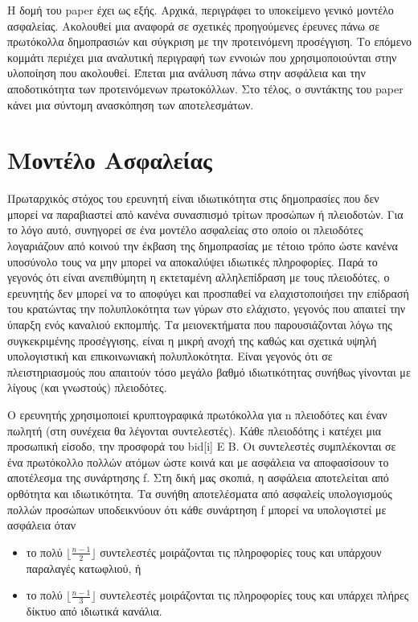 \documentclass[letterpaper,11pt]{article}
\begin{document}
Η δομή του paper έχει ως εξής. Αρχικά, περιγράφει το υποκείμενο γενικό μοντέλο ασφαλείας. Ακολουθεί μια αναφορά
σε σχετικές προηγούμενες έρευνες πάνω σε πρωτόκολλα δημοπρασιών και σύγκριση με την προτεινόμενη προσέγγιση. Το
επόμενο κομμάτι περιέχει μια αναλυτική περιγραφή των εννοιών που χρησιμοποιούνται στην υλοποίηση που ακολουθεί.
Έπεται μια ανάλυση πάνω στην ασφάλεια και την αποδοτικότητα των προτεινόμενων πρωτοκόλλων. Στο τέλος, ο
συντάκτης του paper κάνει μια σύντομη ανασκόπηση των αποτελεσμάτων.

\section{Μοντέλο Ασφαλείας}

Πρωταρχικός στόχος του ερευνητή είναι ιδιωτικότητα στις δημοπρασίες που δεν μπορεί να παραβιαστεί από κανένα
συνασπισμό τρίτων προσώπων ή πλειοδοτών. Για το λόγο αυτό, συνηγορεί σε ένα μοντέλο ασφαλείας στο οποίο οι
πλειοδότες λογαριάζουν από κοινού την έκβαση της δημοπρασίας με τέτοιο τρόπο ώστε κανένα υποσύνολο τους να μην
μπορεί να αποκαλύψει ιδιωτικές πληροφορίες. Παρά το γεγονός ότι είναι ανεπιθύμητη η εκτεταμένη αλληλεπίδραση με
τους πλειοδότες, ο ερευνητής δεν μπορεί να το αποφύγει και προσπαθεί να ελαχιστοποιήσει την επίδρασή του
κρατώντας την πολυπλοκότητα των γύρων στο ελάχιστο, γεγονός που απαιτεί την ύπαρξη ενός καναλιού εκπομπής. Τα
μειονεκτήματα που παρουσιάζονται λόγω της συγκεκριμένης προσέγγισης, είναι η μικρή ανοχή της καθώς και σχετικά
υψηλή υπολογιστική και επικοινωνιακή πολυπλοκότητα. Είναι γεγονός ότι σε πλειστηριασμούς που απαιτούν τόσο
μεγάλο βαθμό ιδιωτικότητας συνήθως γίνονται με λίγους (και γνωστούς) πλειοδότες.

Ο ερευνητής χρησιμοποιεί κρυπτογραφικά πρωτόκολλα για n πλειοδότες και έναν πωλητή (στη συνέχεια θα λέγονται
συντελεστές). Κάθε πλειοδότης i κατέχει μια προσωπική είσοδο, την προσφορά του bid[i] E B. Οι συντελεστές
συμπλέκονται σε ένα πρωτόκολλο πολλών ατόμων ώστε κοινά και με ασφάλεια να αποφασίσουν το αποτέλεσμα της
συνάρτησης f. Στη δική μας σκοπιά, η ασφάλεια αποτελείται από ορθότητα και ιδιωτικότητα. Τα συνήθη
αποτελέσματα από ασφαλείς υπολογισμούς πολλών προσώπων υποδεικνύουν ότι κάθε συνάρτηση f μπορεί να υπολογιστεί
με ασφάλεια όταν
\begin{itemize}
	\item το πολύ $\lfloor \frac{n-1}{2} \rfloor$ συντελεστές μοιράζονται τις πληροφορίες τους και υπάρχουν παραλαγές κατωφλιού, ή 
	\item το πολύ $\lfloor \frac{n-1}{3} \rfloor$ συντελεστές μοιράζονται τις πληροφορίες τους και υπάρχει πλήρες δίκτυο από
ιδιωτικά κανάλια.
\end{itemize}
\end{document}
